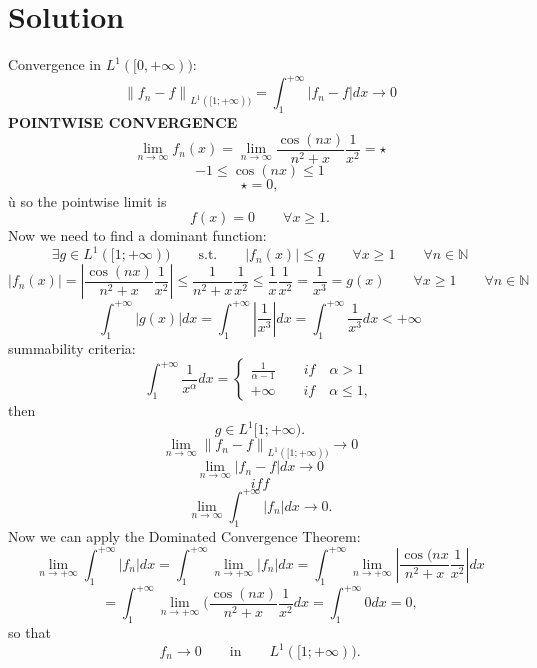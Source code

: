 \documentclass[a4paper, twoside, openany]{book}
\newcommand{\norm}[1]{\left\lVert#1\right\rVert}
\begin{document}
\section*{Solution}
\begin{figure}[!ht]
\begin{center}
\end{center}
\end{figure} \vspace{1 cm}
Convergence in $L^1([0, +\infty))$:
$$\norm{f_n - f}_{L^1([1; +\infty))} = \int_1^{+\infty} |f_n - f| dx \rightarrow 0$$
\textbf{POINTWISE CONVERGENCE}
$$\lim_{n \rightarrow \infty} f_n(x) = \lim_{n \rightarrow \infty} \frac{\cos(nx)}{n^2 + x} \frac{1}{x^2} = \star$$
$$-1 \leq \cos(nx) \leq 1$$
$$\star = 0,$$ù
so the pointwise limit is
$$f(x) = 0 \qquad \forall x \geq 1.$$
Now we need to find a dominant function:
$$\exists g \in L^1([1; +\infty)) \qquad \textrm{s.t.} \qquad |f_n(x)| \leq g \qquad \forall x \geq 1 \qquad \forall n \in \mathbb{N}$$
$$|f_n(x)| = |\frac{\cos(nx)}{n^2 + x} \frac{1}{x^2}| \leq \frac{1}{n^2 + x} \frac{1}{x^2} \leq \frac{1}{x} \frac{1}{x^2} =\frac{1}{x^3} = g(x) \qquad \forall x \geq 1 \qquad \forall n \in \mathbb{N}$$
$$\int_1^{+\infty} |g(x)| dx = \int_1^{+\infty} |\frac{1}{x^3}| dx = \int_1^{+\infty} \frac{1}{x^3} dx < +\infty$$
summability criteria:
$$\int_1^{+\infty} \frac{1}{x^{\alpha}} dx = \begin{cases}
												\frac{1}{\alpha - 1} \qquad if \quad \alpha > 1 \\
												+\infty \qquad if \quad \alpha \leq 1,
											\end{cases}$$
then
$$g \in L^1[1; +\infty).$$
$$\lim_{n \rightarrow \infty} \norm{f_n - f}_{L^1([1; +\infty))} \rightarrow 0$$
$$\lim_{n \rightarrow \infty} |f_n - f| dx \rightarrow 0$$
$$iff$$
$$\lim_{n \rightarrow \infty} \int_1^{+\infty} |f_n| dx \rightarrow 0.$$
Now we can apply the Dominated Convergence Theorem:
$$\lim_{n \rightarrow +\infty} \int_1^{+\infty} |f_n| dx = \int_1^{+\infty} \lim_{n \rightarrow +\infty} |f_n| dx = \int_1^{+\infty} \lim_{n \rightarrow +\infty} |\frac{\cos(nx}{n^2 + x} \frac{1}{x^2}| dx$$
$$= \int_1^{+\infty} \lim_{n \rightarrow +\infty} (\frac{\cos(nx)}{n^2 + x} \frac{1}{x^2} dx = \int_1^{+\infty} 0 dx = 0,$$
so that
$$f_n \rightarrow 0 \qquad \textrm{in} \qquad L^1([1; +\infty)).$$									
\clearpage
\end{document}
